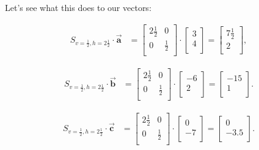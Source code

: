 Let's see what this does to our vectors:

\vspace{-.15in}
\begin{align*}
S_{v=\frac{1}{2},h=2\frac{1}{2}} \cdot \overrightarrow{\textbf{a}} &=
\begin{bmatrix}
2\frac{1}{2} & 0 \\
0 & \frac{1}{2} \\
\end{bmatrix} \cdot
\begin{bmatrix}
3 \\ 4 \\
\end{bmatrix} =
\begin{bmatrix}
7\frac{1}{2} \\ 2 \\
\end{bmatrix},
\end{align*}

\vspace{-.15in}
\begin{align*}
S_{v=\frac{1}{2},h=2\frac{1}{2}} \cdot \overrightarrow{\textbf{b}} &=
\begin{bmatrix}
2\frac{1}{2} & 0 \\
0 & \frac{1}{2} \\
\end{bmatrix} \cdot
\begin{bmatrix}
-6 \\ 2 \\
\end{bmatrix} =
\begin{bmatrix}
-15 \\ 1 \\
\end{bmatrix}.
\end{align*}

\vspace{-.15in}
\begin{align*}
S_{v=\frac{1}{2},h=2\frac{1}{2}} \cdot \overrightarrow{\textbf{c}} &=
\begin{bmatrix}
2\frac{1}{2} & 0 \\
0 & \frac{1}{2} \\
\end{bmatrix} \cdot
\begin{bmatrix}
0 \\ -7 \\
\end{bmatrix} =
\begin{bmatrix}
0 \\ -3.5 \\
\end{bmatrix}.
\end{align*}
\vspace{-.15in}

